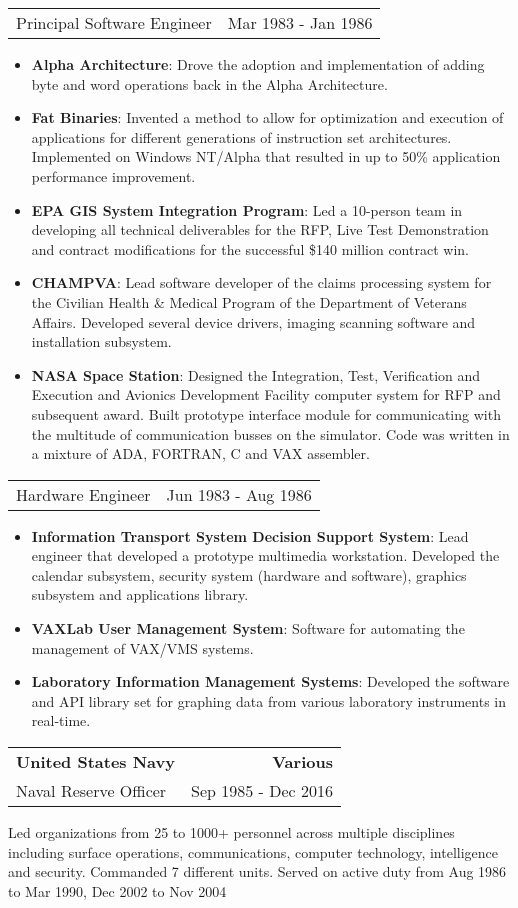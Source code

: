 \documentclass[letterpaper,11pt]{article}
\makeatletter
\newcommand{\resumeSubheading}[4]{
    \item
    \begin{tabular*}{1.0\textwidth}[t]{l@{\extracolsep{\fill}}r}
      \textbf{#1} & \textbf{#2} \\
      {#3} & {#4}
    \end{tabular*}\vspace{-5pt}
  }
\newcommand{\resumeSubSubheading}[2]{
    \vspace{-5pt}
      \item
      \begin{tabular*}{1.0\textwidth}{l@{\extracolsep{\fill}}r}
        {#1} & {#2}
    \end{tabular*}\vspace{-5pt}
}
\newcommand{\resumeJobDescription}[1][]{
    \vspace{-1pt}\par{#1}
}
\newcommand{\resumeItem}[2]{\item{{\textbf{\small#1}}: {\small#2 \vspace{-1pt}}}}
\newcommand{\resumeItemListStart}{\begin{itemize}}
\newcommand{\resumeItemListEnd}{\end{itemize}}\vspace{-10pt}
\makeatother
\begin{document}
        \resumeSubSubheading
          {Principal Software Engineer}{Mar 1983 - Jan 1986}
          \resumeItemListStart
            \resumeItem{Alpha Architecture}{Drove the adoption and implementation of adding byte and word operations back in the Alpha Architecture.}
            \resumeItem{Fat Binaries}{Invented a method to allow for optimization and execution of applications for different generations 
              of instruction set architectures.  Implemented on Windows NT/Alpha that resulted in up to 50\% application performance improvement.}
            \resumeItem{EPA GIS System Integration Program}{Led a 10-person team in developing all technical deliverables for the RFP, Live Test Demonstration and contract
              modifications for the successful \$140 million contract win.}
            \resumeItem{CHAMPVA}{Lead software developer of the claims processing system for the Civilian Health \& Medical Program of the 
              Department of Veterans Affairs.  Developed several device drivers, imaging scanning software and installation subsystem.}
            \resumeItem{NASA Space Station}{Designed the Integration, Test, Verification and Execution and Avionics Development Facility computer system for 
              RFP and subsequent award. Built  prototype interface module for communicating with the multitude of communication busses on the simulator. 
              Code was written in a mixture of ADA, FORTRAN, C and VAX assembler.}
          \resumeItemListEnd
    
        \resumeSubSubheading
          {Hardware Engineer}{Jun 1983 - Aug 1986}
            \resumeItemListStart
                \resumeItem{Information Transport System Decision Support System}{Lead engineer that developed a prototype multimedia workstation. 
                            Developed the calendar subsystem, security system (hardware and software), graphics subsystem and applications library.}
                \resumeItem{VAXLab User Management System}{Software for automating the management of VAX/VMS systems.}
                \resumeItem{Laboratory Information Management Systems}{Developed the software and API library set for graphing 
                            data from various laboratory instruments in real-time.}
            \resumeItemListEnd
  
        \resumeSubheading
          {United States Navy}{Various}
          {Naval Reserve Officer}{Sep 1985 - Dec 2016}
          \resumeJobDescription{Led organizations from 25 to 1000+ personnel across multiple disciplines including surface operations, communications, 
          computer technology, intelligence and security. Commanded 7 different units.  Served on active duty from Aug 1986 to Mar 1990, Dec 2002 to Nov 2004}
            
\end{document}
